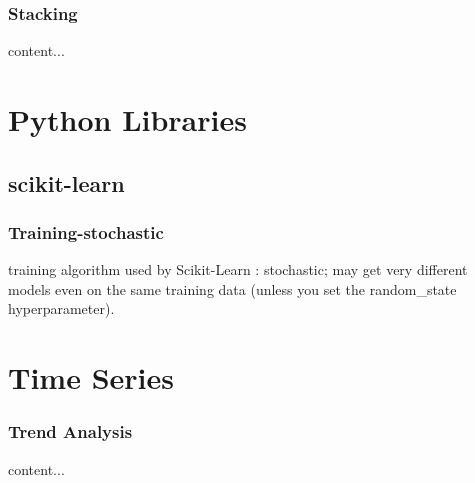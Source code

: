 \documentclass{beamer}
\begin{document}
\begin{frame}\frametitle{Stacking}
	content...
\end{frame}


\section{Python Libraries}
\subsection{scikit-learn}

\begin{frame}\frametitle{Training-stochastic}
training algorithm used by Scikit-Learn : stochastic; may
get very different models even on the same training data (unless you set the random\_state hyperparameter).
\end{frame}




\section{Time Series}
\begin{frame}\frametitle{Trend Analysis}
	content...
\end{frame}	
\end{document}
